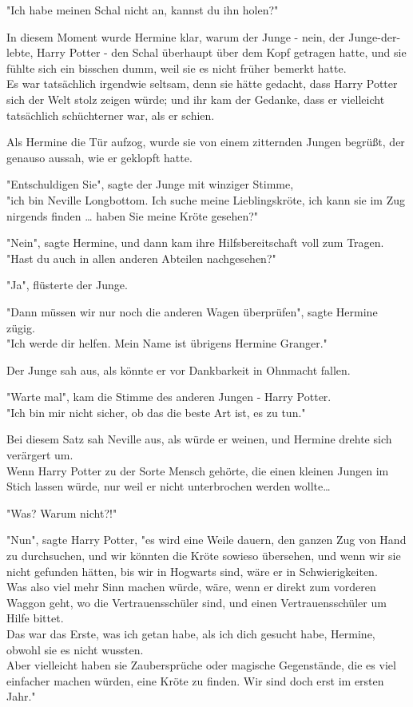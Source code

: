 {"Ich habe meinen Schal nicht an, kannst du ihn holen?"

In diesem Moment wurde Hermine klar, warum der Junge - nein, der Junge-der-lebte, Harry Potter - den Schal überhaupt über dem Kopf getragen hatte, und sie fühlte sich ein bisschen dumm, weil sie es nicht früher bemerkt hatte.\\ Es war tatsächlich irgendwie seltsam, denn sie hätte gedacht, dass Harry Potter sich der Welt stolz zeigen würde; und ihr kam der Gedanke, dass er vielleicht tatsächlich schüchterner war, als er schien.

Als Hermine die Tür aufzog, wurde sie von einem zitternden Jungen begrüßt, der genauso aussah, wie er geklopft hatte.

"Entschuldigen Sie", sagte der Junge mit winziger Stimme,\\ "ich bin Neville Longbottom. Ich suche meine Lieblingskröte, ich kann sie im Zug nirgends finden … haben Sie meine Kröte gesehen?"

"Nein", sagte Hermine, und dann kam ihre Hilfsbereitschaft voll zum Tragen.\\ "Hast du auch in allen anderen Abteilen nachgesehen?"

"Ja", flüsterte der Junge.

"Dann müssen wir nur noch die anderen Wagen überprüfen", sagte Hermine zügig.\\ "Ich werde dir helfen. Mein Name ist übrigens Hermine Granger."

Der Junge sah aus, als könnte er vor Dankbarkeit in Ohnmacht fallen.

"Warte mal", kam die Stimme des anderen Jungen - Harry Potter.\\ "Ich bin mir nicht sicher, ob das die beste Art ist, es zu tun."

Bei diesem Satz sah Neville aus, als würde er weinen, und Hermine drehte sich verärgert um.\\ Wenn Harry Potter zu der Sorte Mensch gehörte, die einen kleinen Jungen im Stich lassen würde, nur weil er nicht unterbrochen werden wollte…

"Was? Warum nicht?!"

"Nun", sagte Harry Potter, "es wird eine Weile dauern, den ganzen Zug von Hand zu durchsuchen, und wir könnten die Kröte sowieso übersehen, und wenn wir sie nicht gefunden hätten, bis wir in Hogwarts sind, wäre er in Schwierigkeiten.\\ Was also viel mehr Sinn machen würde, wäre, wenn er direkt zum vorderen Waggon geht, wo die Vertrauensschüler sind, und einen Vertrauensschüler um Hilfe bittet.\\ Das war das Erste, was ich getan habe, als ich dich gesucht habe, Hermine, obwohl sie es nicht wussten.\\ Aber vielleicht haben sie Zaubersprüche oder magische Gegenstände, die es viel einfacher machen würden, eine Kröte zu finden. Wir sind doch erst im ersten Jahr."

}
